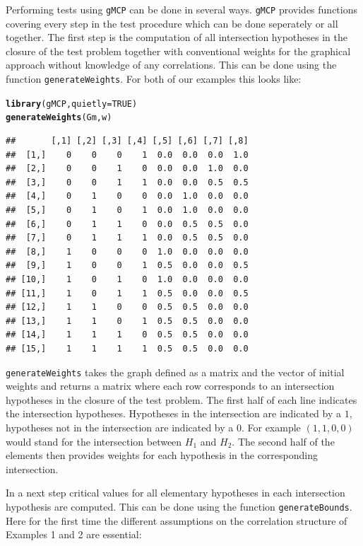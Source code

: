 \documentclass[a4paper, 11pt]{article}\usepackage[]{graphicx}\usepackage[]{color}
\makeatletter
\newcommand{\hlnum}[1]{\textcolor[rgb]{0.686,0.059,0.569}{#1}}%
\newcommand{\hlstd}[1]{\textcolor[rgb]{0.345,0.345,0.345}{#1}}%
\newcommand{\hlkwc}[1]{\textcolor[rgb]{0.333,0.667,0.333}{#1}}%
\newcommand{\hlkwd}[1]{\textcolor[rgb]{0.737,0.353,0.396}{\textbf{#1}}}%
\newenvironment{kframe}{%
 \def\at@end@of@kframe{}%
 \ifinner\ifhmode%
  \def\at@end@of@kframe{\end{minipage}}%
  \begin{minipage}{\columnwidth}%
 \fi\fi%
 \def\FrameCommand##1{\hskip\@totalleftmargin \hskip-\fboxsep
 \colorbox{shadecolor}{##1}\hskip-\fboxsep
     \hskip-\linewidth \hskip-\@totalleftmargin \hskip\columnwidth}%
 \MakeFramed {\advance\hsize-\width
   \@totalleftmargin\z@ \linewidth\hsize
   \@setminipage}}%
 {\par\unskip\endMakeFramed%
 \at@end@of@kframe}
\newenvironment{knitrout}{}{} %
\newcommand{\gmcp}{\texttt{gMCP}\xspace}
\makeatother
\begin{document}
Performing tests using \gmcp can be done in several ways. \gmcp
provides functions covering every step in the test procedure which can
be done seperately or all together. The first step is the computation
of all intersection hypotheses in the closure of the test problem
together with conventional weights for the graphical approach without
knowledge of any correlations. This can be done using the function
\texttt{generateWeights}. For both of our examples this looks like:

\begin{knitrout}
\color{fgcolor}\begin{kframe}
\begin{alltt}
\hlkwd{library}\hlstd{(gMCP,} \hlkwc{quietly} \hlstd{=} \hlnum{TRUE}\hlstd{)}
\hlkwd{generateWeights}\hlstd{(Gm, w)}
\end{alltt}
\begin{verbatim}
##       [,1] [,2] [,3] [,4] [,5] [,6] [,7] [,8]
##  [1,]    0    0    0    1  0.0  0.0  0.0  1.0
##  [2,]    0    0    1    0  0.0  0.0  1.0  0.0
##  [3,]    0    0    1    1  0.0  0.0  0.5  0.5
##  [4,]    0    1    0    0  0.0  1.0  0.0  0.0
##  [5,]    0    1    0    1  0.0  1.0  0.0  0.0
##  [6,]    0    1    1    0  0.0  0.5  0.5  0.0
##  [7,]    0    1    1    1  0.0  0.5  0.5  0.0
##  [8,]    1    0    0    0  1.0  0.0  0.0  0.0
##  [9,]    1    0    0    1  0.5  0.0  0.0  0.5
## [10,]    1    0    1    0  1.0  0.0  0.0  0.0
## [11,]    1    0    1    1  0.5  0.0  0.0  0.5
## [12,]    1    1    0    0  0.5  0.5  0.0  0.0
## [13,]    1    1    0    1  0.5  0.5  0.0  0.0
## [14,]    1    1    1    0  0.5  0.5  0.0  0.0
## [15,]    1    1    1    1  0.5  0.5  0.0  0.0
\end{verbatim}
\end{kframe}
\end{knitrout}


\texttt{generateWeights} takes the graph defined as a matrix and the
vector of initial weights and returns a matrix where each row
corresponds to an intersection hypotheses in the closure of the test
problem. The first half of each line indicates the intersection
hypotheses. Hypotheses in the intersection are indicated by a $1$,
hypotheses not in the intersection are indicated by a $0$. For example
$(1,1,0,0)$ would stand for the intersection between $H_1$ and
$H_2$. The second half of the elements then provides weights for each
hypothesis in the corresponding intersection.

In a next step critical values for all elementary hypotheses in each
intersection hypothesis are computed. This can be done using
the function \texttt{generateBounds}. Here for the first time the
different assumptions on the correlation structure of Examples 1 and 2
are essential:
\end{document}
